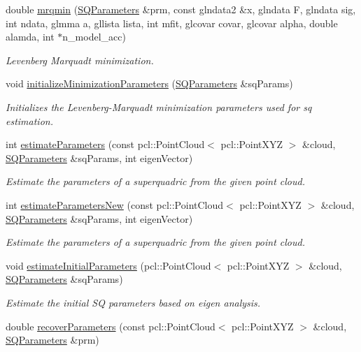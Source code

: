 \begin{DoxyCompactItemize}
\item 
double \hyperlink{namespaceope_a5d543d113e6ec3fa791e317f7fb4477f}{mrqmin} (\hyperlink{classope_1_1_s_q_parameters}{S\-Q\-Parameters} \&prm, const glndata2 \&x, glndata F, glndata sig, int ndata, glmma a, gllista lista, int mfit, glcovar covar, glcovar alpha, double alamda, int $\ast$n\-\_\-model\-\_\-acc)
\begin{DoxyCompactList}\small\item\em Levenberg Marquadt minimization. \end{DoxyCompactList}\item 
void \hyperlink{namespaceope_a444748833a4762249ad2034b1a371264}{initialize\-Minimization\-Parameters} (\hyperlink{classope_1_1_s_q_parameters}{S\-Q\-Parameters} \&sq\-Params)
\begin{DoxyCompactList}\small\item\em Initializes the Levenberg-\/\-Marquadt minimization parameters used for sq estimation. \end{DoxyCompactList}\item 
int \hyperlink{namespaceope_a2f7f74aa34336a020dde069cf05e8d65}{estimate\-Parameters} (const pcl\-::\-Point\-Cloud$<$ pcl\-::\-Point\-X\-Y\-Z $>$ \&cloud, \hyperlink{classope_1_1_s_q_parameters}{S\-Q\-Parameters} \&sq\-Params, int eigen\-Vector)
\begin{DoxyCompactList}\small\item\em Estimate the parameters of a superquadric from the given point cloud. \end{DoxyCompactList}\item 
int \hyperlink{namespaceope_a5b321bd75cd22d494f0ead1b3a951145}{estimate\-Parameters\-New} (const pcl\-::\-Point\-Cloud$<$ pcl\-::\-Point\-X\-Y\-Z $>$ \&cloud, \hyperlink{classope_1_1_s_q_parameters}{S\-Q\-Parameters} \&sq\-Params, int eigen\-Vector)
\begin{DoxyCompactList}\small\item\em Estimate the parameters of a superquadric from the given point cloud. \end{DoxyCompactList}\item 
\hypertarget{namespaceope_aa98be6f253d2dccd997036988e0d9d36}{void \hyperlink{namespaceope_aa98be6f253d2dccd997036988e0d9d36}{estimate\-Initial\-Parameters} (pcl\-::\-Point\-Cloud$<$ pcl\-::\-Point\-X\-Y\-Z $>$ \&cloud, \hyperlink{classope_1_1_s_q_parameters}{S\-Q\-Parameters} \&sq\-Params)}\label{namespaceope_aa98be6f253d2dccd997036988e0d9d36}

\begin{DoxyCompactList}\small\item\em Estimate the initial S\-Q parameters based on eigen analysis. \end{DoxyCompactList}\item 
\hypertarget{namespaceope_aa2241fb739990010c773fd46b3722cf6}{double \hyperlink{namespaceope_aa2241fb739990010c773fd46b3722cf6}{recover\-Parameters} (const pcl\-::\-Point\-Cloud$<$ pcl\-::\-Point\-X\-Y\-Z $>$ \&cloud, \hyperlink{classope_1_1_s_q_parameters}{S\-Q\-Parameters} \&prm)}\label{namespaceope_aa2241fb739990010c773fd46b3722cf6}


\end{DoxyCompactItemize}
